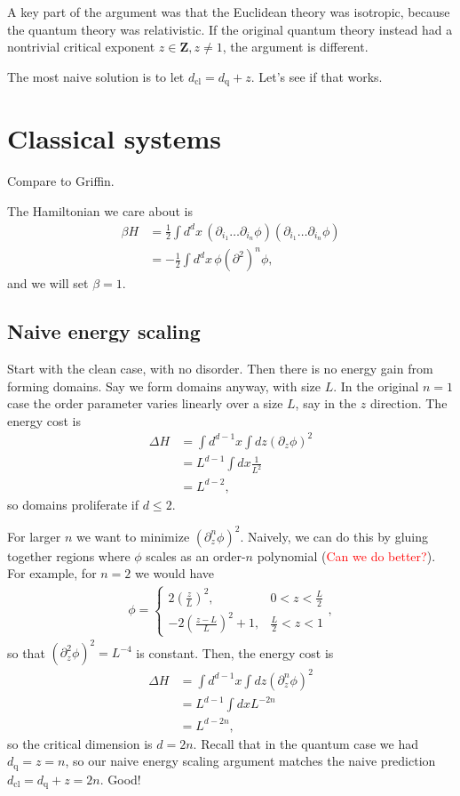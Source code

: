 \documentclass[12pt]{article}
\newcommand{\note}[1]{\textcolor{red}{#1}}
\newcommand{\nn}{\nonumber\\}
\renewcommand{\th}[1]{\frac{1}{#1}}
\newcommand{\half}{\th{2}}
\newcommand{\cl}{\text{cl}}
\newcommand{\q}{\text{q}}
\begin{document}
A key part of the argument was that the Euclidean theory was isotropic, because the quantum theory was relativistic. If the original quantum theory instead had a nontrivial critical exponent $z\in \textbf{Z}, z\ne 1$, the argument is different.

The most naive solution is to let $d_\cl = d_\q + z$. Let's see if that works.

\section{Classical systems}

Compare to Griffin.

The Hamiltonian we care about is
\begin{align}
\beta H &= \half\int d^dx\, (\partial_{ i_1} \dots \partial_{ i_n}\phi) (\partial_{ i_1} \dots \partial_{ i_n}\phi) \nn
&= -\half\int d^dx\, \phi(\partial^2)^n \phi,
\end{align}
and we will set $\beta=1$.

\subsection{Naive energy scaling}

Start with the clean case, with no disorder. Then there is no energy gain from forming domains. Say we form domains anyway, with size $L$. In the original $n=1$ case the order parameter varies linearly over a size $L$, say in the $z$ direction. The energy cost is
\begin{align}
\Delta H &= \int d^{d-1}x \int dz (\partial_z \phi)^2\nn
&= L^{d-1} \int dx \th{L^2}\nn
&= L^{d-2},
\end{align}
so domains proliferate if $d\le 2$.

For larger $n$ we want to minimize $(\partial_z^n \phi)^2$. Naively, we can do this by gluing together regions where $\phi$ scales as an order-$n$ polynomial (\note{Can we do better?}). For example, for $n=2$ we would have
\begin{align}
\phi = \begin{cases}
    2\left(\frac{z}{L}\right)^2, & 0<z<\frac{L}{2}\\
    -2\left(\frac{z-L}{L}\right)^2+1, & \frac{L}{2}<z< 1
\end{cases},
\end{align}
so that $(\partial_z^2 \phi)^2=L^{-4}$ is constant. Then, the energy cost is
\begin{align}
\Delta H &= \int d^{d-1}x \int dz (\partial_z^n \phi)^2\nn
&= L^{d-1} \int dx L^{-2n}\nn
&= L^{d-2n},
\end{align}
so the critical dimension is $d=2n$. Recall that in the quantum case we had $d_\q=z=n$, so our naive energy scaling argument matches the naive prediction $d_\cl = d_\q+z = 2n$. Good!
\end{document}
